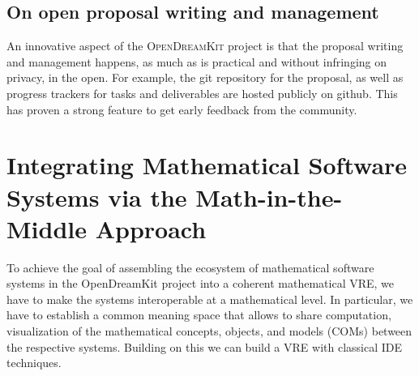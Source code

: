 \documentclass{llncs}
\def\pn{OpenDreamKit\xspace}
\newcommand{\software}[1]{\textsc{#1}\xspace}
\newcommand{\ODK}{\software{OpenDreamKit}}
\begin{document}
\subsection{On open proposal writing and management}

An innovative aspect of the \ODK project is that the proposal writing
and management happens, as much as is practical and without infringing
on privacy, in the open. For example, the git repository for the
proposal, as well as progress trackers for tasks and deliverables are
hosted publicly on github. This has proven a strong feature to get
early feedback from the community.




\section{Integrating Mathematical Software Systems via the Math-in-the-Middle Approach}



To achieve the goal of assembling the ecosystem of mathematical software systems in the
\pn project into a coherent mathematical VRE, we have to make the systems interoperable at
a mathematical level. In particular, we have to establish a common meaning space that
allows to share computation, visualization of the mathematical concepts, objects, and
models (COMs) between the respective systems. Building on this we can build a VRE with
classical IDE techniques. 
\end{document}
